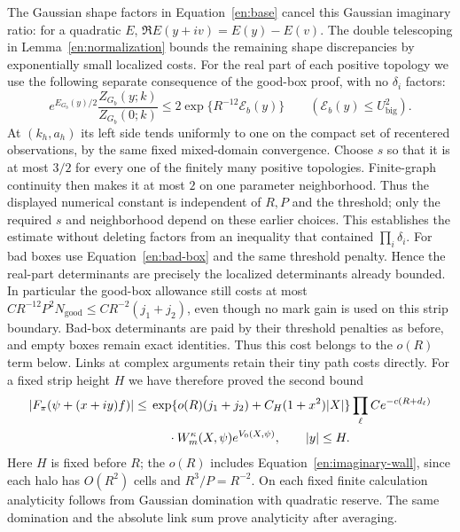 The Gaussian shape factors in Equation~\eqref{en:base} cancel this
Gaussian imaginary ratio: for a quadratic $E$,
$\Re E(y+iv)=E(y)-E(v)$.  The double telescoping in
Lemma~\ref{en:normalization} bounds the remaining shape discrepancies
by exponentially small localized costs.  For the real part of each positive topology we use the following
separate consequence of the good-box proof, with no $\delta_i$ factors:
\[
 e^{E_{G_b}(y)/2}\frac{Z_{G_b}(y;k)}{Z_{G_b}(0;k)}
       \le 2\exp\{R^{-12}\mathcal E_b(y)\}
       \qquad(\mathcal E_b(y)\le U_{\mathrm{big}}^2).
\]
At $(k_h,a_h)$ its left side tends uniformly to one on the compact
set of recentered observations, by the same fixed mixed-domain
convergence.  Choose $s$ so that it is at most $3/2$ for every one
of the finitely many positive topologies.  Finite-graph continuity
then makes it at most $2$ on one parameter neighborhood.  Thus the
displayed numerical constant is independent of $R,P$ and the threshold;
only the required $s$ and neighborhood depend on these earlier choices.  This establishes the estimate without deleting
factors from an inequality that contained $\prod_i\delta_i$.
For bad boxes use Equation~\eqref{en:bad-box} and the same threshold
penalty.  Hence the real-part determinants are precisely the localized
determinants already bounded.
In particular the good-box allowance still costs at most
$CR^{-12}P^2N_{\mathrm{good}}\le CR^{-2}(j_1+j_2)$, even though
no mark gain is used on this strip boundary.  Bad-box determinants
are paid by their threshold penalties as before, and empty boxes
remain exact identities.  Thus this cost belongs to the $o(R)$
term below.  Links at complex arguments retain their tiny path costs directly.
For a fixed strip height $H$ we have therefore proved the second bound
\begin{equation}\label{en:strip-rough}
 \begin{split}
 |F_\pi(\psi+(x+iy)f)|\leq{}&
 \exp\{o(R)(j_1+j_2)+C_H(1+x^2)|X|\}
 \prod_\ell Ce^{-c(R+d_\ell)}\\
 &\hspace{5mm}\cdot W_m^\kappa(X,\psi)e^{V_0(X,\psi)},
                         \qquad |y|\leq H.
 \end{split}
\end{equation}
Here $H$ is fixed before $R$; the $o(R)$ includes
Equation~\eqref{en:imaginary-wall}, since each halo has $O(R^2)$ cells
and $R^3/P=R^{-2}$.  On each fixed finite calculation analyticity
follows from Gaussian domination with quadratic reserve.  The same
domination and the absolute link sum prove analyticity after averaging.

